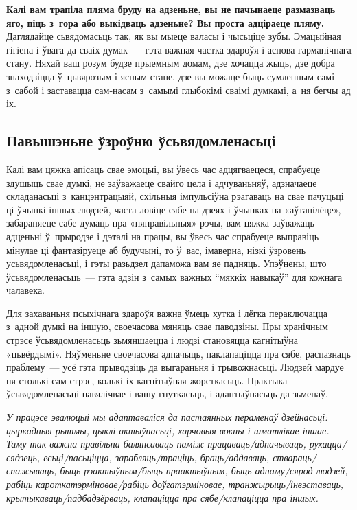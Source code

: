 \textbf{Калі вам трапіла пляма бруду на адзеньне, вы не пачынаеце размазваць яго, піць з~гора або выкідваць адзеньне? Вы проста адціраеце пляму.} Даглядайце сьвядомасьць так, як вы мыеце валасы і чысьціце зубы. Эмацыйная гігіена і ўвага да сваіх думак~--- гэта важная частка здароўя і аснова гарманічнага стану. Няхай ваш розум будзе прыемным домам, дзе хочацца жыць, дзе добра знаходзіцца ў~цьвярозым і ясным стане, дзе вы можаце быць сумленным самі з~сабой і заставацца сам-насам з~самымі глыбокімі сваімі думкамі, а~ня бегчы ад іх.

\subsection*{Павышэньне ўзроўню ўсьвядомленасьці}

Калі вам цяжка апісаць свае эмоцыі, вы ўвесь час адцягваецеся, спрабуеце здушыць свае думкі, не заўважаеце свайго цела і адчуваньняў, адзначаеце складанасьці з~канцэнтрацыяй, схільныя імпульсіўна рэагаваць на свае пачуцьці ці ўчынкі іншых людзей, часта ловіце сябе на дзеях і ўчынках на «аўтапілёце», забараняеце сабе думаць пра «няправільныя» рэчы, вам цяжка заўважаць адценьні ў~прыродзе і дэталі на працы, вы ўвесь час спрабуеце выправіць мінулае ці фантазіруеце аб будучыні, то ў~вас, імаверна, нізкі ўзровень усьвядомленасьці, і гэты разьдзел дапаможа вам яе падняць. Упэўнены, што ўсьвядомленасьць~--- гэта адзін з~самых важных ``мяккіх навыкаў'' для кожнага чалавека.


Для захаваньня псыхічнага здароўя важна ўмець хутка і лёгка пераключацца з~адной думкі на іншую, своечасова мяняць свае паводзіны. Пры хранічным стрэсе ўсьвядомленасьць зьмяншаецца і людзі становяцца кагнітыўна «цьвёрдымі». Няўменьне своечасова адпачыць, паклапаціцца пра сябе, распазнаць праблему~--- усё гэта прыводзіць да выгараньня і трывожнасьці. Людзей мардуе ня столькі сам стрэс, колькі іх кагнітыўная жорсткасьць. Практыка ўсьвядомленасьці павялічвае і вашу гнуткасьць, і адаптыўнасьць да зьменаў.

\emph{У працэсе эвалюцыі мы адаптаваліся да пастаянных пераменаў дзейнасьці: цыркадныя рытмы, цыклі актыўнасьці, харчовыя вокны і шматлікае іншае. Таму так важна правільна балянсаваць паміж працаваць/адпачываць, рухацца/сядзець, есьці/пасьціцца, зарабляць/траціць, браць/аддаваць, ствараць/спажываць, быць рэактыўным/быць праактыўным, быць аднаму/сярод людзей, рабіць кароткатэрміновае/рабіць доўгатэрміновае, транжырыць/інвэставаць, крытыкаваць/падбадзёрваць, клапаціцца пра сябе/клапаціцца пра іншых.}

